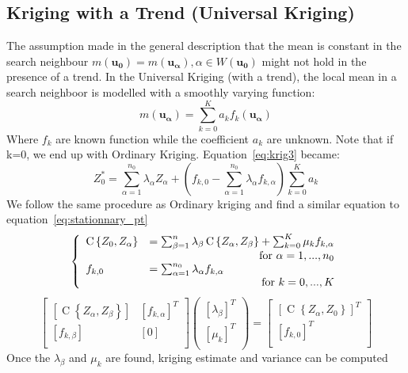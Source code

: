 \documentclass[twocolumn]{article}
\numberwithin{equation}{section}
\begin{document}
\subsection{Kriging with a Trend (Universal Kriging)}
The assumption made in the general description that the mean is constant in the search neighbour $m(\boldsymbol{u_0}) = m(\boldsymbol{u_\alpha}) ,\alpha \in W(\boldsymbol{u_0})$ might not hold in the presence of a trend. In the Universal Kriging (with a trend), the local mean in a search neighboor is modelled with a smoothly varying function:
\[ m(\boldsymbol{u_\alpha})=\sum_{k=0}^K{a_k f_k(\boldsymbol{u_\alpha})}\]
Where $f_k$ are known function while the coefficient $a_k$ are unknown. Note that if k=0, we end up with Ordinary Kriging. Equation~\ref{eq:krig3} became:
\begin{equation}
	Z_0^* =  \sum_{\alpha=1}^{n_0}\lambda_\alpha Z_\alpha + \left( f_{k,0} - \sum_{\alpha=1}^{n_0} \lambda_\alpha f_{k,\alpha} \right) \sum_{k=0}^K a_k
\end{equation}
We follow the same procedure as Ordinary kriging and find a similar equation to equation~\ref{eq:stationnary_pt}
\begin{equation} 
	\left\{
	\begin{array}{ll}
		\operatorname{C}\left\{Z_0, Z_\alpha \right\} &=  \sum_{\beta=1}^n \lambda_\beta \operatorname{C}\left\{Z_\alpha,Z_\beta\right\}
		  + \sum_{k=0}^K \mu_k f_{k,\alpha}  \\&\hfill \text{for } \alpha= 1,...,n_0\\
		f_{k,0} &= \sum_{\alpha=1}^{n_0} \lambda_\alpha f_{k,\alpha} \\& \hfill \text{for } k= 0,...,K\\
	\end{array}
	\right.
\end{equation}
\begin{equation}
		\begin{bmatrix}
       		[\operatorname{C}\left\{Z_\alpha,Z_\beta\right\}]	& [f_{k,\alpha}]^T	\\
       		[f_{k,\beta}]							& [0	]						\\
     	\end{bmatrix} 
     	\begin{pmatrix}
       		[\lambda_\beta]^T 	\\
       		[\mu_k]^T 		\\
     	\end{pmatrix}
     	=
     	\begin{bmatrix}
       		[\operatorname{C}\left\{Z_\alpha,Z_0\right\}]^T 	\\
       		[f_{k,0}]^T 					\\
     	\end{bmatrix}
\end{equation}
Once the $\lambda_\beta$ and $\mu_k$ are found, kriging estimate and variance can be computed
\end{document}

